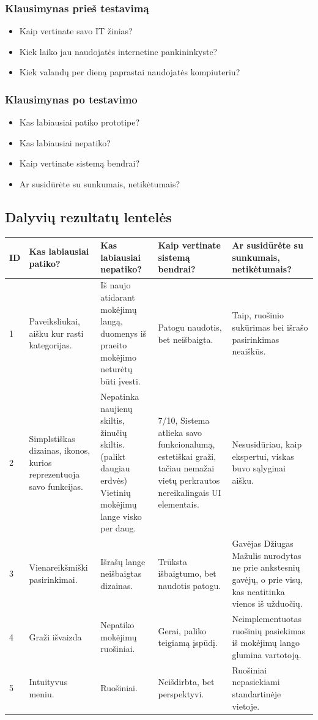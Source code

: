 \documentclass[oneside]{VUMIFPSkursinis}
\begin{document}
\subsubsection{Klausimynas prieš testavimą}
\begin{itemize}
	\item Kaip vertinate savo IT žinias?
	\item Kiek laiko jau naudojatės internetine pankininkyste?
	\item Kiek valandų per dieną paprastai naudojatės kompiuteriu?
\end{itemize}
\subsubsection{Klausimynas po testavimo}
	\begin{itemize}
			\item Kas labiausiai patiko prototipe?
			\item Kas labiausiai nepatiko?
			\item Kaip vertinate sistemą bendrai?
			\item Ar susidūrėte su sunkumais, netikėtumais?
	\end{itemize}
	\newpage
\subsection{Dalyvių rezultatų lentelės}
\begin{center}
	\begin{tabular}{ |p{1cm} | p{3cm} | p{4cm} | p{4cm} | p{3cm} |}
	\hline
ID&Kas labiausiai patiko?&Kas labiausiai nepatiko?&Kaip vertinate sistemą bendrai?&Ar susidūrėte su sunkumais, netikėtumais?\\ \hline
1&Paveiksliukai, aišku kur rasti kategorijas.&Iš naujo atidarant mokėjimų langą, duomenys iš praeito mokėjimo neturėtų būti įvesti.&Patogu naudotis, bet neišbaigta.&Taip, ruošinio sukūrimas bei išrašo pasirinkimas neaiškūs. \\ \hline
2&Simplstiškas dizainas, ikonos, kurios reprezentuoja savo funkcijas.&Nepatinka naujienų skiltis, žinučių skiltis.(palikt daugiau erdvės) Vietinių mokėjimų lange visko per daug.&7/10, Sistema atlieka savo funkcionalumą, estetiškai graži, tačiau nemažai vietų perkrautos nereikalingais UI elementais. & Nesusidūriau, kaip ekspertui, viskas buvo sąlyginai aišku. \\ \hline
3&Vienareikšmiški pasirinkimai.&Išrašų lange neišbaigtas dizainas.& Trūksta išbaigtumo, bet naudotis patogu.&Gavėjas Džiugas Mažulis nurodytas ne prie ankstesnių gavėjų, o prie visų, kas neatitinka vienos iš užduočių. \\ \hline
4&Graži išvaizda&Nepatiko mokėjimų ruošiniai.&Gerai, paliko teigiamą įspūdį.& Neimplementuotas ruošinių pasiekimas iš mokėjimų lango glumina vartotoją.\\ \hline
5&Intuityvus meniu.&Ruošiniai.&Neišdirbta, bet perspektyvi.&Ruošiniai nepasiekiami standartinėje vietoje.\\ \hline
\end{tabular}
\end{center}
\newpage
\end{document}
